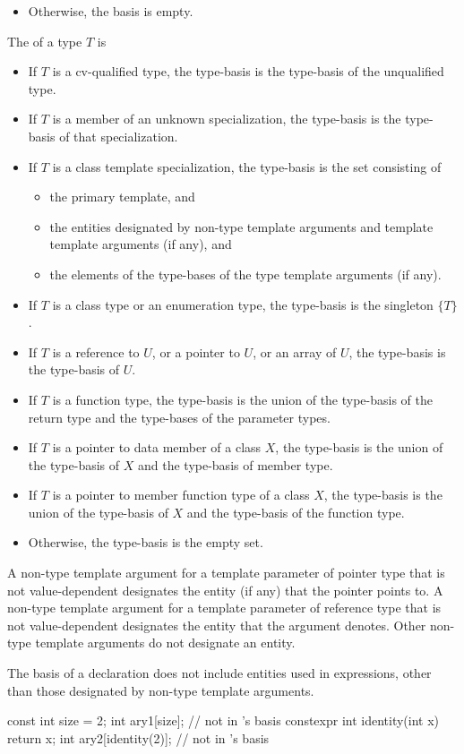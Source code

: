 \begin{std.txt}
\begin{itemize}
\item Otherwise, the basis is empty.
\end{itemize}

The  of a type $T$ is
\begin{itemize}
\item If $T$ is a cv-qualified type, the type-basis is the type-basis of
the unqualified type.
\item If $T$ is a member of an unknown specialization, the type-basis
is the type-basis of that specialization.
\item If $T$ is a class template specialization, the type-basis
is the set consisting of
\begin{itemize}
\item the primary template, and
\item the entities designated by
non-type template arguments and
template template arguments (if any), and
\item the elements of the type-bases
of the type template arguments (if any).
\end{itemize}
\item If $T$ is a class type or an enumeration type, 
the type-basis is the singleton $\{ T \}$.
\item If $T$ is a reference to $U$, or a pointer to $U$, or an array of $U$, the
type-basis is the type-basis of $U$.
\item If $T$ is a function type, the type-basis is the union of the
type-basis of the return type and the type-bases of the parameter types.
\item If $T$ is a pointer to data member of a class $X$, the type-basis is
the union of the type-basis of $X$ and the type-basis of member type.
\item If $T$ is a pointer to member function type of a class $X$, the
type-basis is the union of the type-basis of $X$ and the type-basis of
the function type.
\item Otherwise, the type-basis is the empty set.
\end{itemize}

A non-type template argument for a template parameter of pointer type 
that is not value-dependent designates the entity (if any) that the
pointer points to.
A non-type template argument for a template parameter of reference type
that is not value-dependent designates the entity that the argument
denotes.
Other non-type template arguments do not designate an entity.

\alinea
\begin{note}
The basis of a declaration
does not include entities used in expressions,
other than those designated by non-type template arguments.
\begin{example}
\begin{codeblock}
const int size = 2;
int ary1[size];                         //  not in 's basis
constexpr int identity(int x) { return x; }
int ary2[identity(2)];                  //  not in 's basis


\end{codeblock}
\end{example}
\end{note}
\end{std.txt}
